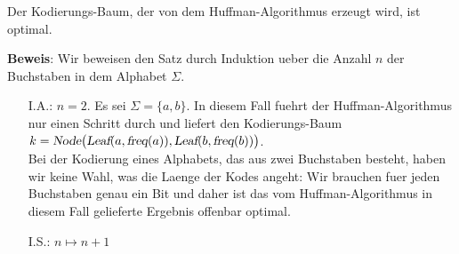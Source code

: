 \begin{Proposition}
  Der Kodierungs-Baum, der von dem Huffman-Algorithmus erzeugt wird, ist optimal.
\end{Proposition}

\noindent
\textbf{Beweis}:  Wir beweisen den Satz durch Induktion ueber die Anzahl $n$ der Buchstaben in dem
Alphabet $\Sigma$.
\begin{enumerate}
\item[I.A.:] $n = 2$.  Es sei $\Sigma= \{a,b\}$.
  In diesem Fall fuehrt der Huffman-Algorithmus nur einen Schritt durch und liefert den Kodierungs-Baum 
  \\[0.2cm]
  \hspace*{1.3cm}
  $k=\textsl{Node}\bigl(\textsl{Leaf}(a, \textsl{freq}(a)), \textsl{Leaf}(b,\textsl{freq}(b))\bigr)$.
  \\[0.2cm]
  Bei der Kodierung eines Alphabets, das aus zwei Buchstaben besteht, haben wir keine Wahl, 
  was die Laenge der Kodes angeht: Wir brauchen fuer jeden Buchstaben genau ein Bit und daher ist das vom
  Huffman-Algorithmus in diesem Fall gelieferte Ergebnis offenbar optimal.
\item[I.S.:] $n \mapsto n+1$


\end{enumerate}
